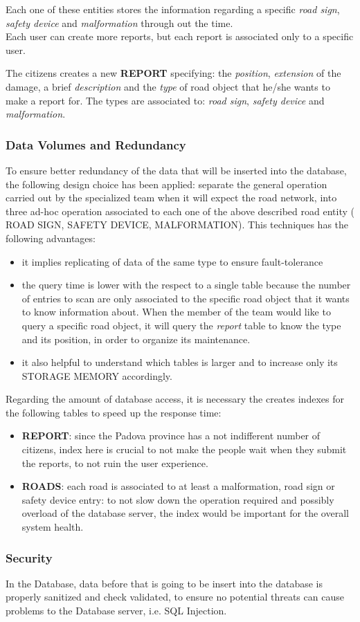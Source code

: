  Each one of these entities stores the information regarding a specific \textit{road sign}, \textit{safety device} and \textit{malformation} through out the time.\\
 Each user can create more reports, but each report is associated only to a specific user.  

 The citizens creates a new \textbf{REPORT} specifying: the \textit{position}, \textit{extension} of the damage, a brief \textit{description} and the \textit{type} of road object that he/she wants to make a report for. The types are associated to: \textit{road sign}, \textit{safety device} and \textit{malformation}.
 

 \subsubsection{Data Volumes and Redundancy}
 To ensure better redundancy of the data that will be inserted into the database, the following design choice has been applied:
 separate the general operation carried out by the specialized team when it will expect the road network, into three ad-hoc operation associated to each one of the above described road entity ( ROAD SIGN, SAFETY DEVICE, MALFORMATION). 
 This techniques has the following advantages:
 \begin{itemize}
     \item it implies replicating of data of the same type to ensure fault-tolerance
      \item the query time is lower with the respect to a single table because the number of entries to scan are only associated to the specific road object that it wants to know information about. When the member of the team would like to query a specific road object, it will query the \textit{report} table to know the type and its position, in order to organize its maintenance.
      \item it also helpful to understand which tables is larger and to increase only its STORAGE MEMORY accordingly.
 \end{itemize}
Regarding the amount of database access, it is necessary the creates indexes for the following tables to speed up the response time:
\begin{itemize}
    \item \textbf{REPORT}: since the Padova province has a not indifferent number of citizens, index here is crucial to not make the people wait when they submit the reports, to not ruin the user experience.
    \item \textbf{ROADS}: each road is associated to at least a malformation, road sign or safety device entry: to not slow down the operation required and possibly overload of the database server, the index would be important for the overall system health.
\end{itemize}
 \subsubsection{Security}
 In the Database, data before that is going to be insert into the database is properly sanitized and check validated, to ensure no potential threats can cause problems to the Database server, i.e. SQL Injection. 